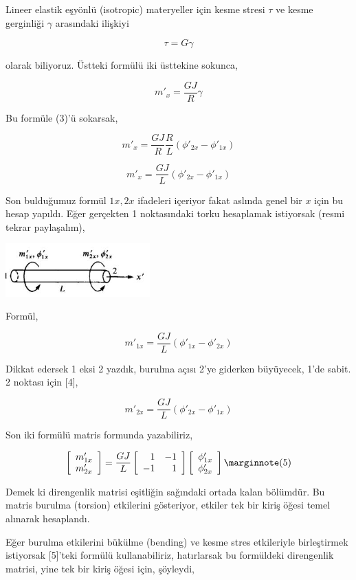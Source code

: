 \documentclass[12pt,fleqn]{article}\usepackage{../../common}
\begin{document}
Lineer elastik eşyönlü (isotropic) materyeller için kesme stresi $\tau$ ve kesme
gerginliği $\gamma$ arasındaki ilişkiyi

$$
\tau = G \gamma
$$

olarak biliyoruz. Üstteki formülü iki üsttekine sokunca,

$$
m'_x = \frac{G J}{R} \gamma
$$

Bu formüle (3)'ü sokarsak, 

$$
m'_x = \frac{G J}{R} \frac{R}{L} ( \phi'_{2x} - \phi'_{1x}  )
$$

$$
m'_x = \frac{G J}{L} ( \phi'_{2x} - \phi'_{1x}  )
$$

Son bulduğumuz formül $1x,2x$ ifadeleri içeriyor fakat aslında genel bir
$x$ için bu hesap yapıldı. Eğer gerçekten 1 noktasındaki torku hesaplamak
istiyorsak (resmi tekrar paylaşalım),

\includegraphics[width=15em]{compscieng_bpp43fem_02.jpg}

Formül,

$$
m'_{1x} = \frac{G J}{L} ( \phi'_{1x} - \phi'_{2x}  )
$$

Dikkat edersek 1 eksi 2 yazdık, burulma açısı 2'ye giderken büyüyecek, 1'de
sabit. 2 noktası için [4],

$$
m'_{2x} = \frac{G J}{L} ( \phi'_{2x} - \phi'_{1x}  )
$$

Son iki formülü matris formunda yazabiliriz,

$$
\left[\begin{array}{c}
m'_{1x} \\ m'_{2x} 
\end{array}\right] =
\frac{GJ}{L}
\left[\begin{array}{rr}
1 & -1 \\ -1 & 1
\end{array}\right]
\left[\begin{array}{c}
\phi'_{1x} \\ \phi'_{2x} 
\end{array}\right]
\mlabel{5}
$$

Demek ki direngenlik matrisi eşitliğin sağındaki ortada kalan bölümdür. Bu
matris burulma (torsion) etkilerini gösteriyor, etkiler tek bir kiriş öğesi
temel alınarak hesaplandı.

Eğer burulma etkilerini bükülme (bending) ve kesme stres etkileriyle
birleştirmek istiyorsak [5]'teki formülü kullanabiliriz, hatırlarsak bu
formüldeki direngenlik matrisi, yine tek bir kiriş öğesi için, şöyleydi,
\end{document}
